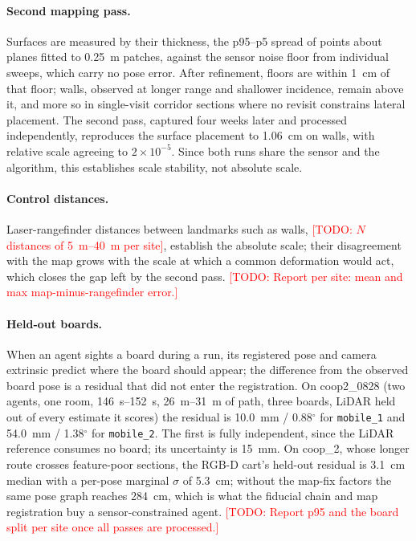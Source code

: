\documentclass[journal]{IEEEtran}
\newcommand{\todo}[1]{\textcolor{red}{[TODO: #1]}}
\begin{document}
\paragraph{Second mapping pass.} Surfaces are measured by their
thickness, the p95--p5 spread of points about planes fitted to
\SI{0.25}{\metre} patches, against the sensor noise floor from
individual sweeps, which carry no pose error. After refinement, floors
are within \SI{1}{\centi\metre} of that floor; walls, observed at
longer range and shallower incidence, remain above it, and more so in
single-visit corridor sections where no revisit constrains lateral
placement. The second pass, captured four weeks later and processed
independently, reproduces the surface placement to
\SI{1.06}{\centi\metre} on walls, with relative scale agreeing to
$2\times10^{-5}$. Since both runs share the sensor and the algorithm,
this establishes scale stability, not absolute scale.

\paragraph{Control distances.} Laser-rangefinder distances between
landmarks such as walls, \todo{$N$ distances of
\SIrange{5}{40}{\metre} per site}, establish the absolute scale; their
disagreement with the map grows with the scale at which a common
deformation would act, which closes the gap left by the second pass.
\todo{Report per site: mean and max map-minus-rangefinder error.}

\paragraph{Held-out boards.} When an agent sights a board during a
run, its registered pose and camera extrinsic predict where the board
should appear; the difference from the observed board pose is a
residual that did not enter the registration. On coop2\_0828 (two
agents, one room, \SIrange{146}{152}{\second}, \SIrange{26}{31}{\metre}
of path, three boards, LiDAR held out of every estimate it scores) the
residual is \SI{10.0}{\milli\metre} / 0.88$^\circ$ for
\texttt{mobile\_1} and \SI{54.0}{\milli\metre} / 1.38$^\circ$ for
\texttt{mobile\_2}. The first is fully independent, since the LiDAR
reference consumes no board; its uncertainty is \SI{15}{\milli\metre}.
On coop\_2, whose longer route crosses feature-poor sections, the
RGB-D cart's held-out residual is \SI{3.1}{\centi\metre} median with a
per-pose marginal $\sigma$ of \SI{5.3}{\centi\metre}; without the
map-fix factors the same pose graph reaches \SI{284}{\centi\metre},
which is what the fiducial chain and map registration buy a
sensor-constrained agent. \todo{Report p95 and the board split per
site once all passes are processed.}
\end{document}
